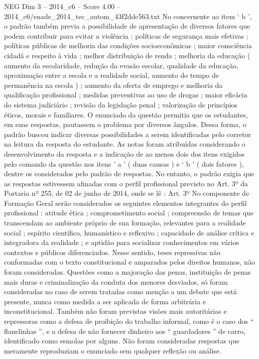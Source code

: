 \begin{textsample}{NEG Dim 3 – 2014\_c6 – Score 4.00 – 2014\_c6/enade\_2014\_tec\_autom\_43f2ddc563.txt}
No concernente ao item ‘ b ’, o padrão também previa a possibilidade de apresentação de diversos fatores que podem contribuir para evitar a violência : políticas de segurança mais efetivas ; políticas públicas de melhoria das condições socioeconômicas ; maior consciência cidadã e respeito à vida ; melhor distribuição de renda ; melhoria da educação ( aumento da escolaridade, redução da evasão escolar, qualidade da educação, aproximação entre a escola e a realidade social, aumento do tempo de permanência na escola ) ; aumento da oferta de emprego e melhoria da qualificação profissional ; medidas preventivas ao uso de drogas ; maior eficácia do sistema judiciário ; revisão da legislação penal ; valorização de princípios éticos, morais e familiares.
O enunciado da questão permitia que os estudantes, em suas respostas, pautassem o problema por diversos ângulos.
Dessa forma, o padrão buscou indicar diversas possibilidades a serem identificadas pelo corretor na leitura da resposta do estudante.
As notas foram atribuídas considerando o desenvolvimento da resposta e a indicação de ao menos dois dos itens exigidos pelo comando da questão nos itens ’ a ’ ( duas causas ) e ‘ b ’ ( dois fatores ), dentre os considerados pelo padrão de respostas.
No entanto, o padrão exigia que as respostas estivessem afinadas com o perfil profissional previsto no Art. 3º da Portaria nº 255, de 02 de junho de 2014, onde se lê : Art. 3º No componente de Formação Geral serão considerados os seguintes elementos integrantes do perfil profissional : atitude ética ; comprometimento social ; compreensão de temas que transcendam ao ambiente próprio de sua formação, relevantes para a realidade social ; espírito científico, humanístico e reflexivo ; capacidade de análise crítica e integradora da realidade ; e aptidão para socializar conhecimentos em vários contextos e públicos diferenciados.
Nesse sentido, teses repressivas não conformadas com o texto constitucional e amparados pelos direitos humanos, não foram consideradas.
Questões como a majoração das penas, instituição de penas mais duras e criminalização da conduta dos menores desviados, só foram consideradas no caso de serem tratadas como menção a um debate que está presente, nunca como medida a ser aplicada de forma arbitrária e inconstitucional.
Também não foram previstas visões mais autoritárias e repressoras como a defesa de proibição do trabalho informal, como é o caso dos “ flanelinhas ”, e a defesa de não fornecer dinheiro aos “ guardadores ” de carro, identificado como esmolas por alguns.
Não foram consideradas respostas que meramente reproduziam o enunciado sem qualquer reflexão ou análise.

\end{textsample}
